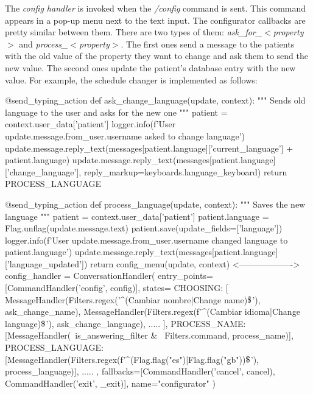 \documentclass[12pt,english]{article}
\newcommand{\dollar}{\mbox{\textdollar}}
\begin{document}
The \emph{config handler} is invoked when the \emph{/config} command is sent. This command appears in a pop-up menu next to the text input. The configurator callbacks are pretty similar between them. There are two types of them: \emph{ask\_for\_$<$property$>$} and \emph{process\_$<$property$>$}. The first ones send a message to the patients with the old value of the property they want to change and ask them to send the new value. The second ones update the patient's database entry with the new value. For example, the schedule changer is implemented as follows:

\begin{python}[caption={Name changer configurator callbacks}, captionpos=b]
  @send_typing_action
  def ask_change_language(update, context):
      """
      Sends old language to the user and asks for the new one
      """
      patient = context.user_data['patient']
      logger.info(f'User {update.message.from_user.username} asked to change language')
      update.message.reply_text(messages[patient.language]['current_language'] + patient.language)
      update.message.reply_text(messages[patient.language]['change_language'], reply_markup=keyboards.language_keyboard)
      return PROCESS_LANGUAGE

  @send_typing_action
  def process_language(update, context):
      """
      Saves the new language
      """
      patient = context.user_data['patient']
      patient.language = Flag.unflag(update.message.text)
      patient.save(update_fields=['language'])
      logger.info(f'User {update.message.from_user.username} changed language to {patient.language}')
      update.message.reply_text(messages[patient.language]['language_updated'])
      return config_menu(update, context)
  <------------------->
  config_handler = ConversationHandler(
      entry_points=[CommandHandler('config', config)],
      states={
          CHOOSING: [
                     MessageHandler(Filters.regex('^(Cambiar nombre|Change name)$\dollar$'), ask_change_name),
                     MessageHandler(Filters.regex(f'^(Cambiar idioma|Change language)$\dollar$'), ask_change_language),
                     .....
                     ],
          PROCESS_NAME: [MessageHandler(~is_answering_filter & ~Filters.command, process_name)],
          PROCESS_LANGUAGE: [MessageHandler(Filters.regex(f'^({Flag.flag("es")}|{Flag.flag("gb")})$\dollar$'),
                                            process_language)],
          .....
      },
      fallbacks=[CommandHandler('cancel', cancel),
                 CommandHandler('exit', _exit)],
      name="configurator"
  )

\end{python}
\end{document}
